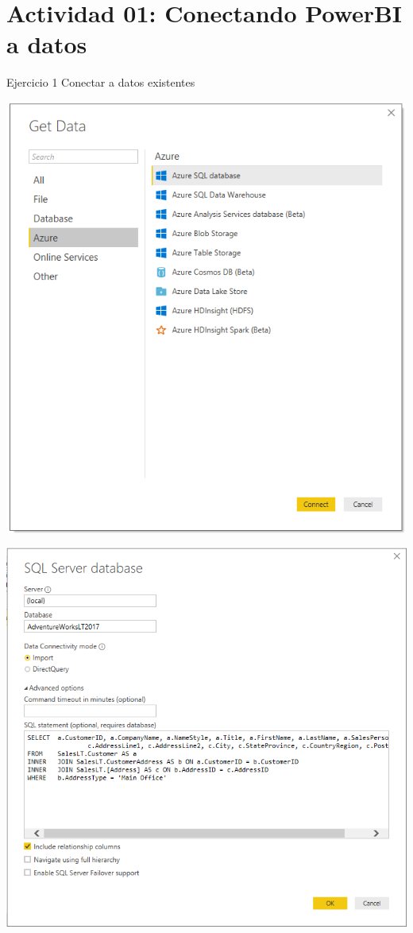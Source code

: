 \section{Actividad 01: Conectando PowerBI a datos} 


Ejercicio 1  Conectar a datos existentes \\
	\begin{center}
	\includegraphics[width=15cm]{./images/power1}
	\end{center}	

	\begin{center}
	\includegraphics[width=15cm]{./images/power2}
	\end{center}	

